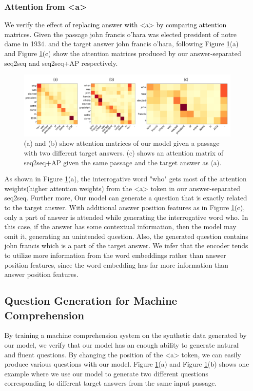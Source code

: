 \documentclass[letterpaper]{article} %
\newcommand{\hh}[1]{\textcolor{black}{#1}}
\begin{document}
\subsubsection{Attention from \textless a\textgreater{} }
We verify the effect of \hh{replacing answer with \textless a\textgreater{} by comparing attention matrices.} Given the passage  john francis o'hara was elected president of notre dame in 1934. and the target answer  john francis o'hara, following Figure \ref{fig:compare_attention}(a) and Figure \ref{fig:compare_attention}(c) show the attention matrices produced by our answer-separated seq2seq and seq2seq+AP respectively.

\begin{figure}[!htb]
	\centering
  	\includegraphics[width = \textwidth ]{attention_compare_final.png}
	\caption{(a) and (b) show attention matrices of our model given a passage with two different target answers. (c) shows an attention matrix of seq2seq+AP given the same passage and the target answer as (a).}
  	\label{fig:compare_attention}
\end{figure}

As shown in Figure \ref{fig:compare_attention}(a), the interrogative word "who" gets most of the attention weights(higher attention weights) from the \textless{}a\textgreater{} token in our answer-separated seq2seq. Further more, Our model can generate a question that is exactly related to the target answer. With additional answer position features as in Figure \ref{fig:compare_attention}(c), only a part of answer is attended while generating the interrogative word who. In this case, if the answer has some contextual information, then the model may omit it, generating an unintended question. Also, the generated question contains john francis which is a part of the target answer. We infer that the encoder tends to utilize more information from the word embeddings rather than answer position features, since the word embedding has far more information than answer position features.


\subsection{Question Generation for Machine Comprehension }
By training a machine comprehension system on the synthetic data generated by our model, we verify that our model has an enough ability to generate natural and fluent questions. By changing the position of the \textless a\textgreater{} token, we can easily produce various questions with our model. Figure \ref{fig:compare_attention}(a) and Figure \ref{fig:compare_attention}(b) shows one example where we use our model to generate two different questions corresponding to different target answers from the same input passage.
\end{document}
